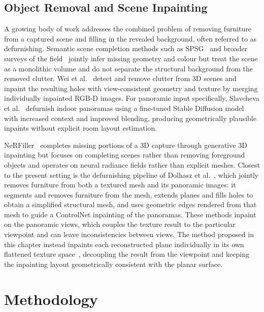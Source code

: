 \subsection{Object Removal and Scene Inpainting}
\label{sec:6_rw_defurnishing}

A growing body of work addresses the combined problem of removing furniture from a captured scene and filling in the revealed background, often referred to as defurnishing. Semantic scene completion methods such as SPSG~\cite{dai_spsg_2020} and broader surveys of the field~\cite{roldao_3d_2022} jointly infer missing geometry and colour but treat the scene as a monolithic volume and do not separate the structural background from the removed clutter. Wei et al.~\cite{wei_clutter_2023} detect and remove clutter from 3D scenes and inpaint the resulting holes with view-consistent geometry and texture by merging individually inpainted RGB-D images. For panoramic input specifically, Slavcheva et al.~\cite{slavcheva_empty_2024} defurnish indoor panoramas using a fine-tuned Stable Diffusion model with increased context and improved blending, producing geometrically plausible inpaints without explicit room layout estimation.

NeRFiller~\cite{weber_nerfiller_2023} completes missing portions of a 3D capture through generative 3D inpainting but focuses on completing scenes rather than removing foreground objects and operates on neural radiance fields rather than explicit meshes. Closest to the present setting is the defurnishing pipeline of Dolhasz et al.~\cite{dolhasz_defurnishing_2025}, which jointly removes furniture from both a textured mesh and its panoramic images: it segments and removes furniture from the mesh, extends planes and fills holes to obtain a simplified structural mesh, and uses geometric edges rendered from that mesh to guide a ControlNet inpainting of the panoramas. These methods inpaint on the panoramic views, which couples the texture result to the particular viewpoint and can leave inconsistencies between views. The method proposed in this chapter instead inpaints each reconstructed plane individually in its own flattened texture space~\cite{vermandere_semantic_2024}, decoupling the result from the viewpoint and keeping the inpainting layout geometrically consistent with the planar surface.


\section{Methodology}
\label{sec:6_methodology}

